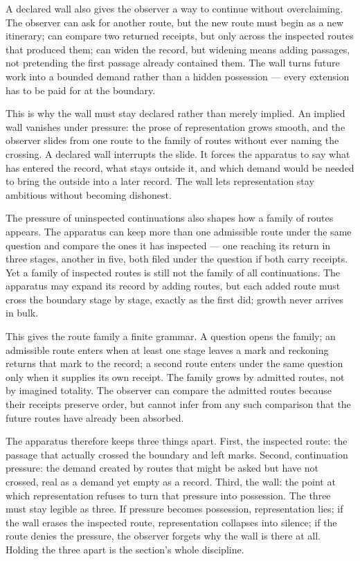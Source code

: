 A declared wall also gives the observer a way to continue without overclaiming. The observer can ask for another route, but the new route must begin as a new itinerary; can compare two returned receipts, but only across the inspected routes that produced them; can widen the record, but widening means adding passages, not pretending the first passage already contained them. The wall turns future work into a bounded demand rather than a hidden possession --- every extension has to be paid for at the boundary.

This is why the wall must stay declared rather than merely implied. An implied wall vanishes under pressure: the prose of representation grows smooth, and the observer slides from one route to the family of routes without ever naming the crossing. A declared wall interrupts the slide. It forces the apparatus to say what has entered the record, what stays outside it, and which demand would be needed to bring the outside into a later record. The wall lets representation stay ambitious without becoming dishonest.

The pressure of uninspected continuations also shapes how a family of routes appears. The apparatus can keep more than one admissible route under the same question and compare the ones it has inspected --- one reaching its return in three stages, another in five, both filed under the question if both carry receipts. Yet a family of inspected routes is still not the family of all continuations. The apparatus may expand its record by adding routes, but each added route must cross the boundary stage by stage, exactly as the first did; growth never arrives in bulk.

This gives the route family a finite grammar. A question opens the family; an admissible route enters when at least one stage leaves a mark and reckoning returns that mark to the record; a second route enters under the same question only when it supplies its own receipt. The family grows by admitted routes, not by imagined totality. The observer can compare the admitted routes because their receipts preserve order, but cannot infer from any such comparison that the future routes have already been absorbed.

The apparatus therefore keeps three things apart. First, the inspected route: the passage that actually crossed the boundary and left marks. Second, continuation pressure: the demand created by routes that might be asked but have not crossed, real as a demand yet empty as a record. Third, the wall: the point at which representation refuses to turn that pressure into possession. The three must stay legible as three. If pressure becomes possession, representation lies; if the wall erases the inspected route, representation collapses into silence; if the route denies the pressure, the observer forgets why the wall is there at all. Holding the three apart is the section's whole discipline.

